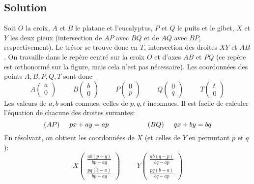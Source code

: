 \documentclass{article}
\newcommand{\hascoord}[2]{\left(\begin{array}{c}{#1}\\{#2}\end{array}\right)}
\begin{document}
\subsection{Solution}
\begin{center}
\end{center}
Soit $O$ la croix, $A$ et $B$ le platane et l'eucalyptus, $P$ et $Q$ le puits et le gibet, $X$ et $Y$ les deux pieux (intersection de $AP$ avec $BQ$ et de $AQ$ avec $BP$, respectivement). Le trésor se trouve donc en $T$, intersection des droites $XY$ et $AB$. On travaille dans le repère centré sur la croix $O$ et d'axes $AB$ et $PQ$ (ce repère est orthonormé sur la figure, mais cela n'est pas nécessaire). Les coordonnées des points $A,B,P,Q,T$ sont donc
\[
A\hascoord{a}{0}\hspace{1cm}B\hascoord{b}{0}
\hspace{1cm}
P\hascoord{0}{p}\hspace{1cm}Q\hascoord{0}{q}
\hspace{1cm}
T\hascoord{t}{0}
\]
Les valeurs de $a,b$ sont connues, celles de $p,q,t$ inconnues. Il est facile de calculer l'équation de chacune des droites suivantes:
\[
(AP)\hspace{.5cm}px+ay = ap
\hspace{2cm}
(BQ)\hspace{.5cm}qx+by = bq
\]
En résolvant, on obtient les coordonnées de $X$ (et celles de $Y$ en permutant $p$ et $q$):
\[
X\hascoord{\frac{ab(p-q)}{bp-aq}}{\frac{pq(b-a)}{bp-aq}}
\hspace{1cm}
Y\hascoord{\frac{ab(q-p)}{bq-ap}}{\frac{pq(b-a)}{bq-ap}}
\]
\end{document}
